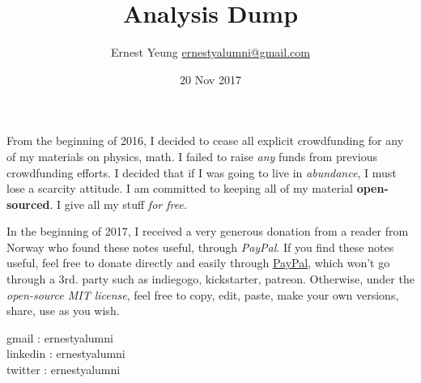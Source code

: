 \documentclass[10pt]{amsart}
\title{Analysis Dump}
\author{Ernest Yeung \href{mailto:ernestyalumni@gmail.com}{ernestyalumni@gmail.com}}
\date{20 Nov 2017}
\begin{document}

\maketitle

From the beginning of 2016, I decided to cease all explicit crowdfunding for any of my materials on physics, math.  I failed to raise \emph{any} funds from previous crowdfunding efforts.  I decided that if I was going to live in \emph{abundance}, I must lose a scarcity attitude.  I am committed to keeping all of my material \textbf{open-sourced}.  I give all my stuff \emph{for free}.   

In the beginning of 2017, I received a very generous donation from a reader from Norway who found these notes useful, through \emph{PayPal}.  If you find these notes useful, feel free to donate directly and easily through \href{https://www.paypal.com/cgi-bin/webscr?cmd=_donations&business=ernestsaveschristmas%2bpaypal%40gmail%2ecom&lc=US&item_name=ernestyalumni&currency_code=USD&bn=PP%2dDonationsBF%3abtn_donateCC_LG%2egif%3aNonHosted}{PayPal}, which won't go through a 3rd. party such as indiegogo, kickstarter, patreon.  Otherwise, under the \emph{open-source MIT license}, feel free to copy, edit, paste, make your own versions, share, use as you wish.    

\noindent gmail        : ernestyalumni \\
linkedin     : ernestyalumni \\
twitter      : ernestyalumni \\
\end{document}
